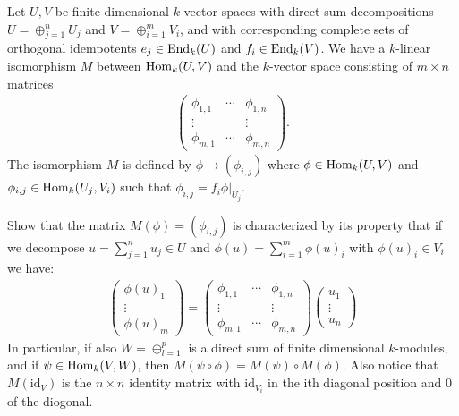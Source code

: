 \begin{thm}
Let \(U,V\) be finite dimensional \(k\)-vector spaces with direct sum decompositions
\(U=\oplus _{j=1}^nU_{j}\) and \(V=\oplus _{i=1}^mV_{i}\), and with corresponding complete sets of orthogonal idempotents \(e_{j}\in \operatorname{End}_{k}(U)\) and \(f_{i}\in \operatorname{End}_{k}(V)\). We have a \(k\)-linear isomorphism \(M\) between \(\operatorname{Hom}_{k}(U,V)\) and the \(k\)-vector space consisting of \(m\times n\) matrices
\begin{gather*}
\begin{pmatrix}\phi _{1,1}&\cdots &\phi _{1,n}\\
\vdots &&\vdots \\
\phi _{m,1}&\cdots &\phi _{m,n}\end{pmatrix}.
\end{gather*}
The isomorphism \(M\) is defined by \(\phi \rightarrow (\phi _{i,j})\) where \(\phi \in \operatorname{Hom}_{k}(U,V)\) and \(\phi _{i,j}\in \operatorname{Hom}_{k}(U_{j},V_{i})\) such that \(\phi _{i,j}=f_{i}\phi |_{U_{j}}\).

Show that the matrix \(M(\phi )=(\phi _{i,j})\) is characterized by its property that if we decompose \(u=\sum _{j=1}^n u_{j}\in U\) and \(\phi (u)=\sum _{i=1}^m\phi (u)_{i}\) with \(\phi (u)_{i}\in V_{i}\) we have:
\begin{gather*}
\begin{pmatrix}\phi (u)_{1} \\ \vdots  \\ \phi (u)_{m}\end{pmatrix}=\begin{pmatrix}\phi _{1,1}&\cdots &\phi _{1,n}\\
\vdots &&\vdots \\
\phi _{m,1}&\cdots &\phi _{m,n}\end{pmatrix}
\begin{pmatrix}u_{1}\\\vdots \\u_{n}\end{pmatrix}
\end{gather*}
In particular, if also \(W=\oplus _{l=1}^p\) is a direct sum of finite dimensional \(k\)-modules, and if \(\psi \in \operatorname{Hom}_{k}(V,W)\), then \(M(\psi \circ \phi )=M(\psi )\circ M(\phi ).\) Also notice that \(M(\text{id}_V)\) is the \(n\times n\) identity matrix with \(\text{id}_{V_{i}}\) in the ith diagonal position and \(0\) of the diogonal.
\end{thm}

